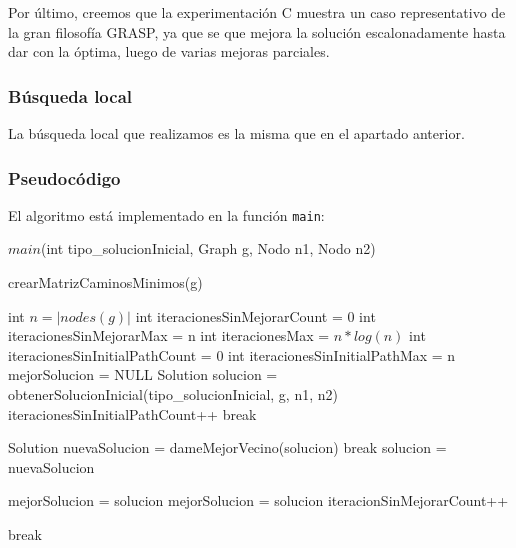 Por último, creemos que la experimentación C muestra un caso representativo de la gran filosofía GRASP, ya que se que mejora la solución escalonadamente hasta dar con la óptima, luego de varias mejoras parciales.


\subsubsection{Búsqueda local}

La búsqueda local que realizamos es la misma que en el apartado anterior.

\subsubsection{Pseudocódigo}

El algoritmo está implementado en la función \texttt{main}:

\begin{algorithm}[H]
\caption{$main$(int tipo\_solucionInicial, Graph g, Nodo n1, Nodo n2)}
\begin{algorithmic}[1]
  \State crearMatrizCaminosMinimos(g)
  
  \State int $n = |nodes(g)|$
  \State int iteracionesSinMejorarCount = 0
  \State int iteracionesSinMejorarMax = n
  \State int iteracionesMax = $n * log(n)$
  \State int iteracionesSinInitialPathCount = 0
  \State int iteracionesSinInitialPathMax = n
  \State mejorSolucion = NULL
  	\State Solution solucion = obtenerSolucionInicial(tipo\_solucionInicial, g, n1, n2)	
    		\State iteracionesSinInitialPathCount++
			break
		\EndIf
        \EndIf

  
	    	\State Solution nuevaSolucion = dameMejorVecino(solucion)
			\State break	
		\EndIf    
		\State solucion = nuevaSolucion	
	    \EndWhile
	  
	  	\State mejorSolucion = solucion
	  	\State mejorSolucion = solucion
	  \Else
	  	\State iteracionSinMejorarCount++
	  \EndIf
	\EndIf
	
                \State break
        \EndIf
	  
    \EndFor
\end{algorithmic}
\end{algorithm}

